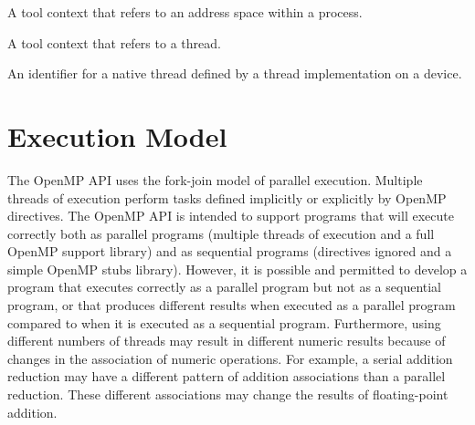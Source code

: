 {
\glossarydefstart
A tool context that refers to an address space within a process.
\glossarydefend

\glossarydefstart
A tool context that refers to a thread.
\glossarydefend

\glossarydefstart
An identifier for a native thread defined by a thread implementation on a device.
\glossarydefend

}

\section{Execution Model}
\label{sec:Execution Model}
The OpenMP API uses the fork-join model of parallel execution. Multiple threads of
execution perform tasks defined implicitly or explicitly by OpenMP directives. The
OpenMP API is intended to support programs that will execute correctly both as parallel
programs (multiple threads of execution and a full OpenMP support library) and as
sequential programs (directives ignored and a simple OpenMP stubs library). However,
it is possible and permitted to develop a program that executes correctly as a parallel
program but not as a sequential program, or that produces different results when 
executed as a parallel program compared to when it is executed as a sequential program. 
Furthermore, using different numbers of threads may result in different numeric results 
because of changes in the association of numeric operations. For example, a serial 
addition reduction may have a different pattern of addition associations than a parallel 
reduction. These different associations may change the results of floating-point addition.

